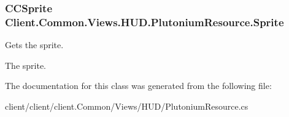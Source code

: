 \subsubsection[{Sprite}]{\setlength{\rightskip}{0pt plus 5cm}C\+C\+Sprite Client.\+Common.\+Views.\+H\+U\+D.\+Plutonium\+Resource.\+Sprite\hspace{0.3cm}{\ttfamily [get]}}\label{classClient_1_1Common_1_1Views_1_1HUD_1_1PlutoniumResource_addd487469c856c1778480729ade2ba73}


Gets the sprite. 

The sprite.

The documentation for this class was generated from the following file\+:\begin{DoxyCompactItemize}
\item 
client/client/client.\+Common/\+Views/\+H\+U\+D/Plutonium\+Resource.\+cs\end{DoxyCompactItemize}
